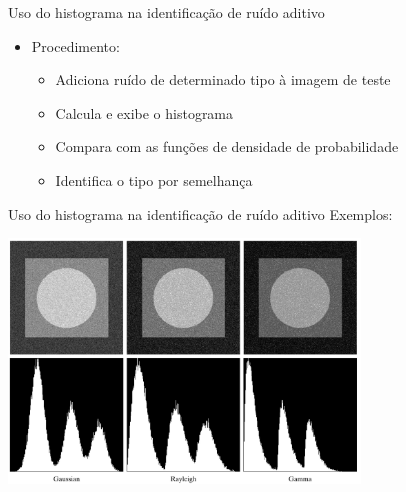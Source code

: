 \begin{slide}[toc=]{Uso do histograma na identificação de ruído aditivo}
        {
	\begin{itemize}
		\item Procedimento:
			\begin{itemize}
				\item Adiciona ruído de determinado tipo à imagem de teste
				\item Calcula e exibe o histograma
				\item Compara com as funções de densidade de probabilidade
				\item Identifica o tipo por semelhança
			\end{itemize}
	\end{itemize}
	}
\end{slide}
      
\begin{slide}[toc=]{Uso do histograma na identificação de ruído aditivo}
Exemplos:
	\begin{center}
		\includegraphics[width=0.7\textwidth]{figs/5-04a}
	\end{center}
\end{slide}

